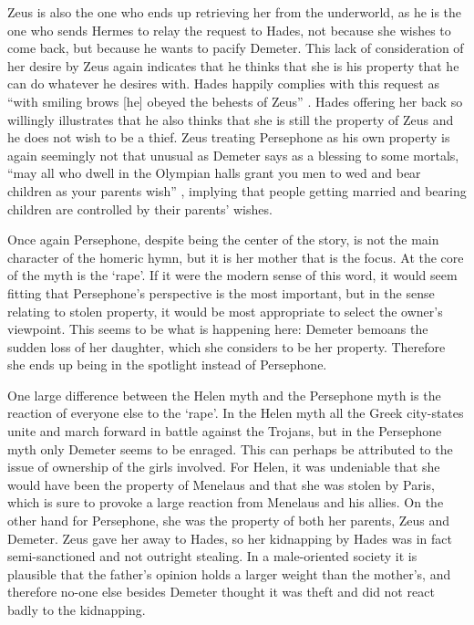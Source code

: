 \documentclass[11pt]{article}
\begin{document}
Zeus is also the one who ends up retrieving her from the underworld, as he is the one who sends Hermes to relay the request to Hades, not because she wishes to come back, but because he wants to pacify Demeter.
This lack of consideration of her desire by Zeus again indicates that he thinks that she is his property that he can do whatever he desires with.
Hades happily complies with this request as ``with smiling brows [he] obeyed the behests of Zeus'' \cite[line 388]{persephone}.
Hades offering her back so willingly illustrates that he also thinks that she is still the property of Zeus and he does not wish to be a thief.
Zeus treating Persephone as his own property is again seemingly not that unusual as Demeter says as a blessing to some mortals,
``may all who dwell in the Olympian halls grant you men to wed and bear children as your parents wish'' \cite[line 136]{persephone}, implying that people getting married and bearing children are controlled by their parents' wishes.

Once again Persephone, despite being the center of the story, is not the main character of the homeric hymn, but it is her mother that is the focus.
At the core of the myth is the `rape'.
If it were the modern sense of this word, it would seem fitting that Persephone's perspective is the most important, but in the sense relating to stolen property, it would be most appropriate to select the owner's viewpoint.
This seems to be what is happening here: Demeter bemoans the sudden loss of her daughter, which she considers to be her property.
Therefore she ends up being in the spotlight instead of Persephone.

One large difference between the Helen myth and the Persephone myth is the reaction of everyone else to the `rape'.
In the Helen myth all the Greek city-states unite and march forward in battle against the Trojans, but in the Persephone myth only Demeter seems to be enraged.
This can perhaps be attributed to the issue of ownership of the girls involved.
For Helen, it was undeniable that she would have been the property of Menelaus and that she was stolen by Paris, which is sure to provoke a large reaction from Menelaus and his allies.
On the other hand for Persephone, she was the property of both her parents, Zeus and Demeter.
Zeus gave her away to Hades, so her kidnapping by Hades was in fact semi-sanctioned and not outright stealing.
In a male-oriented society it is plausible that the father's opinion holds a larger weight than the mother's, and therefore no-one else besides Demeter thought it was theft and did not react badly to the kidnapping.
\end{document}
